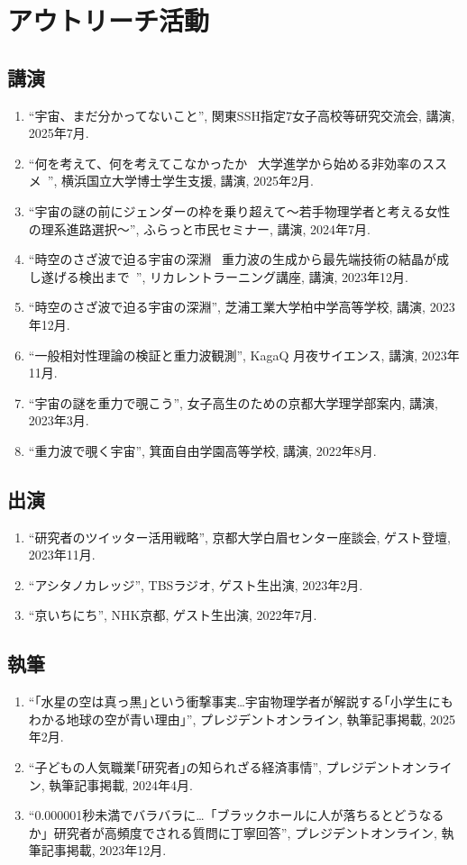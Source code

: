 \documentclass[uplatex, 11pt]{jsarticle}
\begin{document}

\section*{アウトリーチ活動}
\subsection*{講演}
\begin{enumerate}
\item “宇宙、まだ分かってないこと”, 関東SSH指定7女子高校等研究交流会, 講演, 2025年7月.
\item “何を考えて、何を考えてこなかったか ~大学進学から始める非効率のススメ~”, 横浜国立大学博士学生支援, 講演, 2025年2月.
\item “宇宙の謎の前にジェンダーの枠を乗り超えて〜若手物理学者と考える女性の理系進路選択〜”, ふらっと市民セミナー, 講演, 2024年7月.
\item “時空のさざ波で迫る宇宙の深淵 ~重力波の生成から最先端技術の結晶が成し遂げる検出まで~”, リカレントラーニング講座, 講演, 2023年12月.
\item “時空のさざ波で迫る宇宙の深淵”, 芝浦工業大学柏中学高等学校, 講演, 2023年12月.
\item “一般相対性理論の検証と重力波観測”, KagaQ 月夜サイエンス, 講演, 2023年11月.
\item “宇宙の謎を重力で覗こう”, 女子高生のための京都大学理学部案内, 講演, 2023年3月.
\item “重力波で覗く宇宙”, 箕面自由学園高等学校, 講演, 2022年8月.
\end{enumerate}
\subsection*{出演}
\begin{enumerate}
\item “研究者のツイッター活用戦略”, 京都大学白眉センター座談会, ゲスト登壇, 2023年11月.
\item “アシタノカレッジ”, TBSラジオ, ゲスト生出演, 2023年2月.
\item “京いちにち”, NHK京都, ゲスト生出演, 2022年7月.
\end{enumerate}
\subsection*{執筆}
\begin{enumerate}
\item “｢水星の空は真っ黒｣という衝撃事実…宇宙物理学者が解説する｢小学生にもわかる地球の空が青い理由｣”, プレジデントオンライン, 執筆記事掲載, 2025年2月.
\item “子どもの人気職業｢研究者｣の知られざる経済事情”, プレジデントオンライン, 執筆記事掲載, 2024年4月.
\item “0.000001秒未満でバラバラに…「ブラックホールに人が落ちるとどうなるか」研究者が高頻度でされる質問に丁寧回答”, プレジデントオンライン, 執筆記事掲載, 2023年12月.
\end{enumerate}
\end{document}
